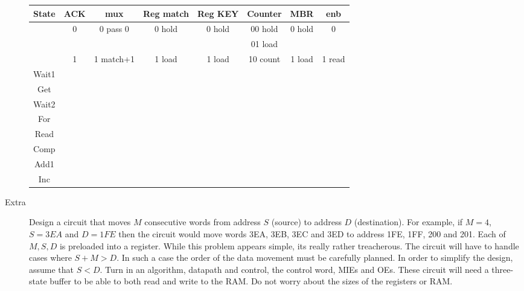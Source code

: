 \begin{description}
{\tiny
\begin{tabular}{c||c|c|c|c|c|c|c}  
State   & ACK   & mux       &  Reg match& Reg KEY & Counter     & MBR    & enb             \\ \hline
        & 0     & 0 pass 0  &  0 hold   & 0 hold  & 00 hold     & 0 hold & 0      \\ \hline
        &       &           &           &         & 01 load     &        &               \\ \hline
        & 1     & 1 match+1 &  1 load   & 1 load  & 10 count    & 1 load & 1 read  \\ \hline \hline
Wait1   &      &          &          &        &           &       &               \\ \hline
Get     &      &          &          &        &           &       &             \\ \hline
Wait2   &      &          &          &        &           &       &             \\ \hline
For     &      &          &          &        &           &       &           \\ \hline
Read    &      &          &          &        &           &       &             \\ \hline
Comp    &      &          &          &        &           &       &             \\ \hline
Add1    &      &          &          &        &           &       &        \\ \hline
Inc     &      &          &          &        &           &       &            \\ 
\end{tabular} }

\pagebreak

\item [Extra]
Design a circuit that moves $M$ consecutive words from address $S$ (source) to
address $D$ (destination).  For example, if $M=4$, $S=3EA$ and $D=1FE$ then the
circuit would move words 3EA, 3EB, 3EC and 3ED to address 1FE, 1FF, 200 and 201.
Each of $M,S,D$ is preloaded into a register.  While this problem appears simple,
its really rather treacherous.  The circuit will have to handle cases where
$S+M > D$.  In such a case the order of the data movement must be carefully planned.
In order to simplify the design, assume that $S<D$.  Turn in an algorithm,
datapath and control, the
control word, MIEs and OEs.  These circuit will need a three-state buffer to
be able to both read and write to the RAM.  Do not worry about the sizes of the
registers or RAM.



\end{description}
